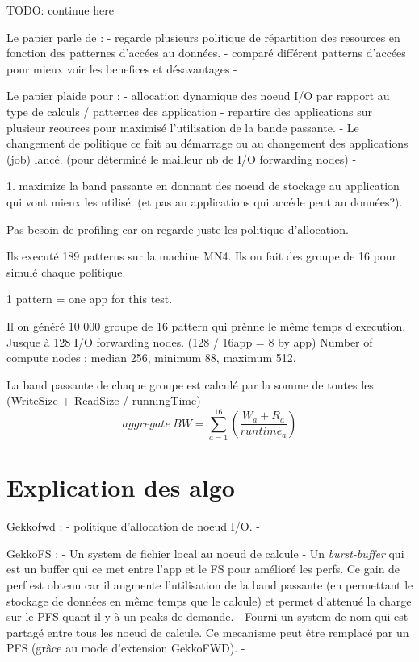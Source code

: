\documentclass[10pt, a4paper]{article}
\begin{document}
TODO: continue here


Le papier parle de :
- regarde plusieurs politique de répartition des resources en fonction des patternes d'accées au données.
- comparé différent patterns d'accées pour mieux voir les benefices et désavantages
- 


Le papier plaide pour :
- allocation dynamique des noeud I/O par rapport au type de calculs / patternes des application
- repartire des applications sur plusieur reources pour maximisé l'utilisation de la bande passante.
- Le changement de politique ce fait au démarrage ou au changement des applications (job) lancé. (pour déterminé le mailleur nb de I/O forwarding nodes)
- 

1. maximize la band passante en donnant des noeud de stockage au application qui vont mieux les utilisé. (et pas au applications qui accéde peut au données?).

Pas besoin de profiling car on regarde juste les politique d'allocation.

Ils executé 189 patterns sur la machine MN4.
Ils on fait des groupe de 16 pour simulé chaque politique.

1 pattern = one app for this test.

Il on généré 10 000 groupe de 16 pattern qui prènne le même temps d'execution.
Jusque à 128 I/O forwarding nodes. (128 / 16app = 8 by app)
Number of compute nodes : median 256, minimum 88, maximum 512.

La band passante de chaque groupe est calculé par la somme de toutes les (WriteSize + ReadSize / runningTime)
\begin{equation*}aggregate\ BW=\sum_{a=1}^{16}\left(\frac{W_{a}+R_{a}}{runtime_{a}}\right) \tag{2}\end{equation*}

\section{Explication des algo}
Gekkofwd :
- politique d'allocation de noeud I/O.
- 

GekkoFS :
- Un system de fichier local au noeud de calcule
- Un \emph{burst-buffer} qui est un buffer qui ce met entre l'app et le FS pour amélioré les perfs. Ce gain de perf est obtenu car il augmente l'utilisation de la band passante (en permettant le stockage de données en même temps que le calcule) et permet d'attenué la charge sur le PFS quant il y à un peaks de demande.
- Fourni un system de nom qui est partagé entre tous les noeud de calcule. Ce mecanisme peut être remplacé par un PFS (grâce au mode d'extension GekkoFWD).
- 
\end{document}
